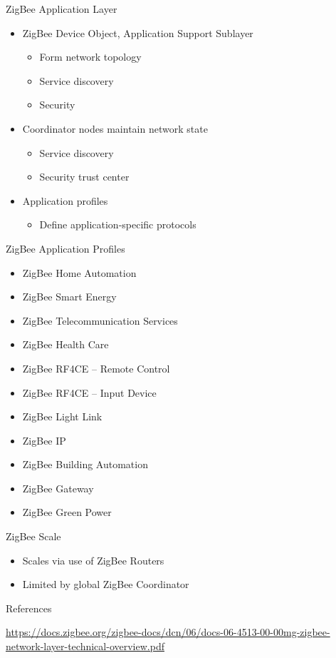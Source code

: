 \documentclass{beamer}
\begin{document}
\begin{frame}{ZigBee Application Layer}
  \begin{itemize}
  	\item ZigBee Device Object, Application Support Sublayer
  	\begin{itemize}
  		\item Form network topology
  		\item Service discovery
  		\item Security
  	\end{itemize}
  	\item Coordinator nodes maintain network state
  	\begin{itemize}
  		\item Service discovery
  		\item Security trust center
  	\end{itemize}
  	\item Application profiles
  	\begin{itemize}
  		\item Define application-specific protocols 
  	\end{itemize}
  \end{itemize}
\end{frame}

\begin{frame}{ZigBee Application Profiles}
  \begin{itemize}
  	\item ZigBee Home Automation
    \item ZigBee Smart Energy
    \item ZigBee Telecommunication Services
    \item ZigBee Health Care
    \item ZigBee RF4CE – Remote Control
    \item ZigBee RF4CE – Input Device
    \item ZigBee Light Link
    \item ZigBee IP
    \item ZigBee Building Automation
    \item ZigBee Gateway
    \item ZigBee Green Power
  \end{itemize}
\end{frame}

\begin{frame}{ZigBee Scale}
  \begin{itemize}
	\item Scales via use of ZigBee Routers
	\item Limited by global ZigBee Coordinator
  \end{itemize}
\end{frame}

\begin{frame}{References}
\begin{thebibliography}{9}
\url{https://docs.zigbee.org/zigbee-docs/dcn/06/docs-06-4513-00-00mg-zigbee-network-layer-technical-overview.pdf}
\end{thebibliography}
\end{frame}
\end{document}
